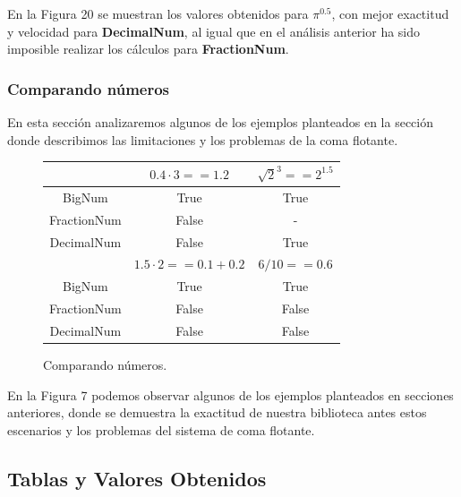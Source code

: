 \documentclass[a4paper,10pt,twocolumn]{article}
\begin{document}
	En la Figura 20 se muestran los valores obtenidos para $\pi^{0.5}$, con mejor exactitud y velocidad para \textbf{DecimalNum}, al igual que en el análisis anterior ha sido imposible realizar los cálculos para \textbf{FractionNum}.
	
\subsubsection{Comparando números}\label{sub:number_comp}

	En esta sección analizaremos algunos de los ejemplos planteados en la sección donde describimos las limitaciones y los problemas de la coma flotante.
	
	\begin{figure}[h!]%
		\begin{center}
			\begin{tabular}{|c|c|c|} \hline
			 			 & $0.4\cdot 3==1.2$ 	    & $\sqrt{2}^3==2^{1.5}$ 	\\ \hline
			BigNum       &  True  & True     \\ \hline
			FractionNum  &  False &   -   \\ \hline
			DecimalNum   &  False & True   \\ \hline
						& $1.5\cdot 2==0.1+0.2$ 	    & $6/10==0.6$	\\ \hline
			BigNum       &  True  & True     \\ \hline
			FractionNum  &  False & False  \\ \hline
			DecimalNum   &  False & False  \\ \hline

\end{tabular}
		\caption{Comparando números. \label{fig:ex}}
		\end{center}
	\end{figure}
	
	En la Figura 7 podemos observar algunos de los ejemplos planteados en secciones anteriores, donde se demuestra la exactitud de nuestra biblioteca antes estos escenarios y los problemas del sistema de coma flotante.
  
	
	
\onecolumn
\subsection{Tablas y Valores Obtenidos}\label{sub:table}
	
\end{document}
